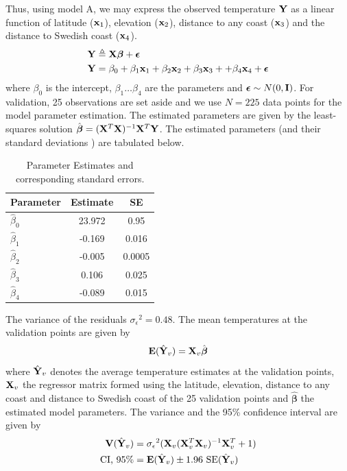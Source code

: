\documentclass[a4paper,10pt]{article}
\def\bY{{\bf Y}}
\def\bX{{\bf X}}
\def\bE{{\bf E}}
\def\bV{{\bf V}}
\def\bx{{\bf x}}
\def\bbeta{{\boldsymbol \beta}}
\def\sigmaeps{{\sigma_{\epsilon}}}
\begin{document}
Thus, using model A, we may express the observed temperature $\bY$ as a linear function of latitude ($\bx_1$), elevation ($\bx_2$), distance to any coast ($\bx_3$) and the distance to Swedish coast ($\bx_4$).
\begin{align}
  \bY &\triangleq \bX \bbeta +  {\boldsymbol \epsilon}  \nonumber \\
   \bY &= \beta_0 + \beta_1 \bx_1 + \beta_2 \bx_2 + \beta_3 \bx_3 + + \beta_4 \bx_4 + {\boldsymbol \epsilon}
\end{align}
where $\beta_0$ is the intercept, $\beta_1 \dots \beta_4$ are the parameters and ${\boldsymbol \epsilon} \sim N(0,{\bf I})$. For  validation, 25 observations are set aside and we use $N = 225$ data points for the model parameter estimation. The estimated parameters are given by the least-squares solution $\hat \bbeta = (\bX^T \bX)^{-1} \bX^T \bY$. The estimated parameters (and their standard deviations ) are tabulated below.
\begin{table}[H]
\centering
\begin{tabular}{lcc}
\hline
{\bf Parameter} & {\bf Estimate} & {\bf SE }\\
\hline
$\hat \beta_0$ & 23.972 & 0.95 \\
$\hat \beta_1$ & -0.169 & 0.016\\
$\hat \beta_2$ & -0.005 & 0.0005 \\
$\hat \beta_3$ & 0.106 & 0.025\\
$\hat \beta_4$ & -0.089 & 0.015\\
\hline
\end{tabular}
\caption{Parameter Estimates and corresponding standard errors.}
\label{tab:olsest}
\end{table}
The variance of the residuals $\sigmaeps^2 = 0.48$. The mean temperatures at the validation points are given by
\begin{equation}
\bE(\hat \bY_v) = \bX_v \hat \bbeta
\end{equation}
where $\hat \bY_v$ denotes the average temperature estimates at the validation points, $\bX_v$  the regressor matrix formed using the latitude, elevation, distance to any coast and distance to Swedish coast of the 25 validation points and $\hat \bbeta$ the estimated model parameters. The variance and the 95\% confidence interval are given by
\begin{align*}
\bV(\hat \bY_v) &= \sigmaeps^2 (\bX_v (\bX_v^T\bX_v)^{-1} \bX_v^T + 1) \\
\text{CI, 95\%} &= \bE(\hat \bY_v) \pm 1.96 \text{ SE}(\hat \bY_v)
\end{align*}
\end{document}
